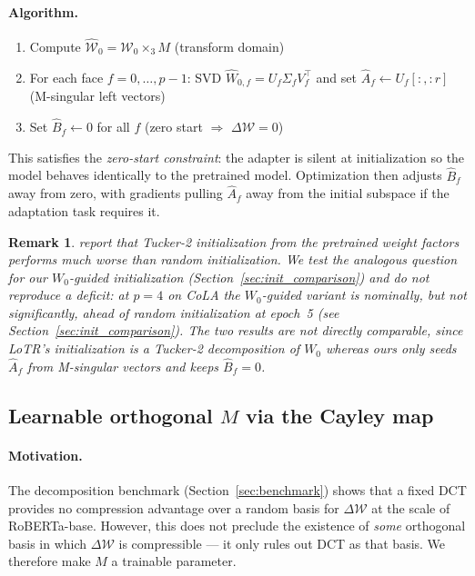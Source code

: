 \documentclass{article}
\newcommand{\cW}{\mathcal{W}}
\newcommand{\DeltaW}{\Delta\mathcal{W}}
\newcommand{\transpose}{^{\!\top}}
\theoremstyle{plain}
\newtheorem{remark}{Remark}
\begin{document}
\paragraph{Algorithm.}
\begin{enumerate}
  \item Compute $\hat{\cW}_0 = \cW_0 \times_3 M$ \hfill (transform domain)
  \item For each face $f = 0, \dots, p-1$: SVD $\hat{W}_{0,f} = U_f \Sigma_f V_f\transpose$
        and set $\hat{A}_f \leftarrow U_f[:, :r]$ \hfill (M-singular left vectors)
  \item Set $\hat{B}_f \leftarrow 0$ for all $f$ \hfill (zero start $\Rightarrow$ $\DeltaW = 0$)
\end{enumerate}
This satisfies the \emph{zero-start constraint}: the adapter is silent at
initialization so the model behaves identically to the pretrained model.
Optimization then adjusts $\hat{B}_f$ away from zero,
with gradients pulling $\hat{A}_f$ away from the initial subspace if the
adaptation task requires it.

\begin{remark}
\citet{bershatsky2024lotr} report that Tucker-2 initialization from the pretrained
weight factors performs much \emph{worse} than random initialization.
We test the analogous question for our $W_0$-guided initialization
(Section~\ref{sec:init_comparison}) and do \emph{not} reproduce a deficit:
at $p=4$ on CoLA the $W_0$-guided variant is nominally, but not significantly,
ahead of random initialization at epoch~5 (see Section~\ref{sec:init_comparison}).
The two results are not directly comparable, since LoTR's initialization is a
Tucker-2 decomposition of $W_0$ whereas ours only seeds $\hat{A}_f$ from M-singular vectors
and keeps $\hat{B}_f = 0$.
\end{remark}

\subsection{Learnable orthogonal $M$ via the Cayley map}
\label{sec:learnable_M}

\paragraph{Motivation.}
The decomposition benchmark (Section~\ref{sec:benchmark}) shows that a fixed DCT
provides no compression advantage over a random basis for $\DeltaW$ at the scale
of RoBERTa-base.
However, this does not preclude the existence of \emph{some} orthogonal basis in
which $\DeltaW$ is compressible — it only rules out DCT as that basis.
We therefore make $M$ a trainable parameter.
\end{document}
